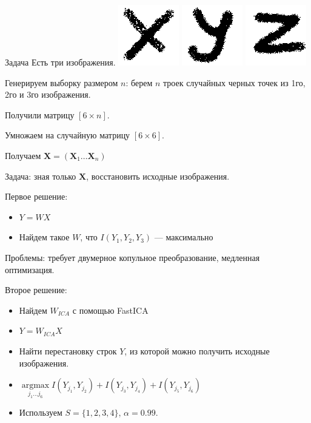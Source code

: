 \documentclass[14pt]{beamer}
\begin{document}
\begin{frame}{Задача}
    Есть три изображения.
    \includegraphics[scale=0.5]{x.png}
    \includegraphics[scale=0.5]{y.png}
    \includegraphics[scale=0.5]{z.png}

    Генерируем выборку размером $n$:
    берем $n$ троек случайных черных точек из 1го, 2го и 3го изображения.

    Получили матрицу $[6 \times n]$.

    Умножаем на случайную матрицу $[6\times6]$.

    Получаем $\mathbf X = (\mathbf X_1 \dots \mathbf X_n)$

    Задача: зная только $\mathbf X$, восстановить исходные изображения.

\end{frame}

\begin{frame}
Первое решение:
\begin{itemize}
    \item $Y = W X $
    \item Найдем такое $W$, что $ I (Y_1, Y_2,Y_3) $ — максимально
\end{itemize}
\pause
Проблемы:
требует двумерное копульное преобразование,
медленная оптимизация.
\end{frame}

\begin{frame}
    Второе решение:
    \begin{itemize}
        \item Найдем $W_{ICA}$ с помощью FastICA
        \item $ Y = W_{ICA} X $
        \item Найти перестановку строк $Y$, из которой можно получить исходные изображения.
        \item $\mathop{argmax}\limits_{j_1 \dots j_6} I(Y_{j_1}, Y_{j_2}) + I(Y_{j_3}, Y_{j_4})  + I(Y_{j_5}, Y_{j_6}) $
        \item Используем $ S = \{ 1, 2, 3, 4 \} $, $\alpha = 0.99$.
    \end{itemize}
\end{frame}
\end{document}
